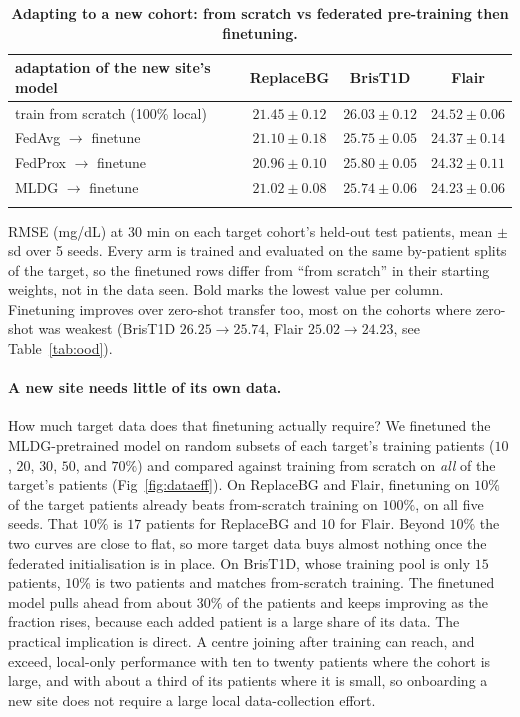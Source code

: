 \documentclass[10pt,letterpaper]{article}
\newlength\savedwidth
\newcommand\thickhline{\noalign{\global\savedwidth\arrayrulewidth\global\arrayrulewidth 2pt}%
\hline
\noalign{\global\arrayrulewidth\savedwidth}}
\begin{document}
\begin{table}[!ht]
\centering
\captionsetup{justification=centering,singlelinecheck=on}
\caption{\bf Adapting to a new cohort: from scratch vs federated pre-training then finetuning.}
\label{tab:finetune}
\begin{tabular}{lccc}
\thickhline
adaptation of the new site's model & ReplaceBG & BrisT1D & Flair \\
\hline
train from scratch (100\% local) & $21.45 \pm 0.12$ & $26.03 \pm 0.12$ & $24.52 \pm 0.06$ \\
\hline
FedAvg $\rightarrow$ finetune  & $21.10 \pm 0.18$ & $25.75 \pm 0.05$ & $24.37 \pm 0.14$ \\
FedProx $\rightarrow$ finetune & $\mathbf{20.96 \pm 0.10}$ & $25.80 \pm 0.05$ & $24.32 \pm 0.11$ \\
MLDG $\rightarrow$ finetune    & $21.02 \pm 0.08$ & $\mathbf{25.74 \pm 0.06}$ & $\mathbf{24.23 \pm 0.06}$ \\
\thickhline
\end{tabular}
\begin{center}
{\small RMSE (mg/dL) at 30 min on each target cohort's held-out test patients,
mean $\pm$ sd over 5 seeds. Every arm is trained and evaluated on the same
by-patient splits of the target, so the finetuned rows differ from ``from
scratch'' in their starting weights, not in the data seen. Bold marks the lowest value per
column. Finetuning improves over zero-shot transfer too, most on the cohorts where
zero-shot was weakest (BrisT1D $26.25\rightarrow25.74$, Flair
$25.02\rightarrow24.23$, see Table~\ref{tab:ood}).}
\end{center}
\end{table}

\paragraph{A new site needs little of its own data.} How much target data
does that finetuning actually require? We finetuned the MLDG-pretrained model
on random subsets of each target's training patients ($10$, $20$, $30$, $50$,
and $70\%$) and compared against training from scratch on \emph{all} of the
target's patients (Fig~\ref{fig:dataeff}). On ReplaceBG and Flair, finetuning
on $10\%$ of the target patients already beats from-scratch training on
$100\%$, on all five seeds. That $10\%$ is $17$ patients for ReplaceBG and
$10$ for Flair. Beyond $10\%$ the two curves are close to flat, so more target
data buys almost nothing once the federated initialisation is in place. On
BrisT1D, whose training pool is only $15$ patients, $10\%$ is two patients and
matches from-scratch training. The finetuned model pulls ahead from about
$30\%$ of the patients and keeps improving as the fraction rises, because
each added patient is a large share of its data. The practical implication is
direct. A centre joining after training can reach, and exceed, local-only
performance with ten to twenty patients where the cohort is large, and with
about a third of its patients where it is small, so onboarding a new site
does not require a large local data-collection effort.
\end{document}
